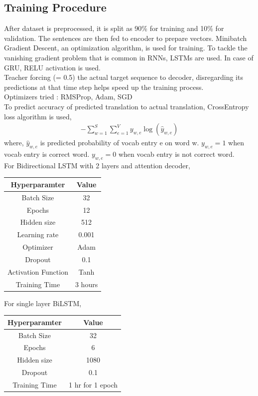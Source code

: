 \documentclass[11pt, oneside]{article}   	%
\begin{document}
\subsection{Training Procedure}
After dataset is preprocessed, it is split as 90\% for training and 10\% for validation. The sentences are then fed to encoder to prepare vectors. Minibatch Gradient Descent, an optimization algorithm, is used for training. To tackle the vanishing gradient problem that is common in RNNs, LSTMs are used. In case of GRU, RELU activation is used.\\
Teacher forcing (= 0.5) the actual target sequence to decoder, disregarding its predictions at that time step helps speed up the training process.\\
Optimizers tried : RMSProp, Adam, SGD\\
To predict accuracy of predicted translation to actual translation, CrossEntropy loss algorithm is used,
\begin{align*}
- \sum_{w=1}^S \sum_{e=1}^V y_{w,e} \log(\hat{y}_{w,e})
\end{align*}
where, $\hat{y}_{w,e}$ is predicted probability of vocab entry e on word w. $y_{w,e} = 1$ when vocab entry is correct word. $y_{w,e} = 0$ when vocab entry is not correct word. \\ 
For Bidirectional LSTM with 2 layers and attention decoder,
\begin{center}
\begin{tabular}{ ||c|c|| } 
 \hline
 Hyperparamter & Value \\ [0.5ex] 
 \hline\hline
 Batch Size & 32 \\
 \hline 
 Epochs & 12  \\ 
 \hline
 Hidden size & 512\\ 
 \hline
 Learning rate & 0.001 \\
 \hline
 Optimizer & Adam\\
 \hline
 Dropout & 0.1\\
 \hline
  Activation Function & Tanh \\
 \hline
  Training Time & 3 hours\\
 \hline
\end{tabular}
\end{center}

For single layer BiLSTM, 
\begin{center}
\begin{tabular}{ ||c|c|| } 
 \hline
 Hyperparamter & Value \\ [0.5ex] 
 \hline\hline
 Batch Size & 32 \\
 \hline 
 Epochs & 6  \\ 
 \hline
 Hidden size & 1080\\ 
 \hline
 Dropout & 0.1\\
 \hline
  Training Time & 1 hr for 1 epoch\\
 \hline
\end{tabular}
\end{center}
\end{document}
